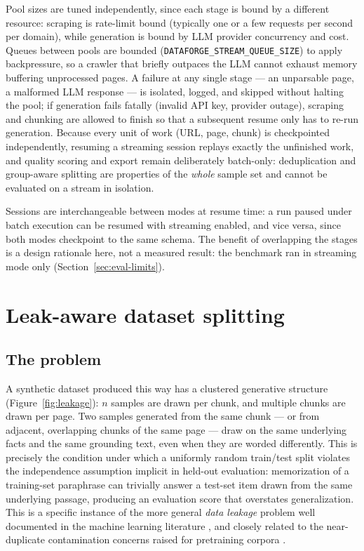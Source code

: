 \documentclass[11pt]{article}
\begin{document}
Pool sizes are tuned independently, since each stage is bound by a
different resource: scraping is rate-limit bound (typically one or a few
requests per second per domain), while generation is bound by LLM
provider concurrency and cost. Queues between pools are bounded
(\texttt{DATAFORGE\_STREAM\_QUEUE\_SIZE}) to apply backpressure, so a
crawler that briefly outpaces the LLM cannot exhaust memory buffering
unprocessed pages. A failure at any single stage --- an unparsable page,
a malformed LLM response --- is isolated, logged, and skipped without
halting the pool; if generation fails fatally (invalid API key,
provider outage), scraping and chunking are allowed to finish so that a
subsequent resume only has to re-run generation. Because every unit of
work (URL, page, chunk) is checkpointed independently, resuming a
streaming session replays exactly the unfinished work, and quality
scoring and export remain deliberately batch-only: deduplication and
group-aware splitting are properties of the \emph{whole} sample set and
cannot be evaluated on a stream in isolation.

Sessions are interchangeable between modes at resume time: a run paused
under batch execution can be resumed with streaming enabled, and vice
versa, since both modes checkpoint to the same schema. The benefit of
overlapping the stages is a design rationale here, not a measured result:
the benchmark ran in streaming mode only (Section~\ref{sec:eval-limits}).

\section{Leak-aware dataset splitting}
\label{sec:leakage}

\subsection{The problem}
A synthetic dataset produced this way has a clustered generative
structure (Figure~\ref{fig:leakage}): $n$ samples are drawn per chunk,
and multiple chunks are drawn per page. Two samples generated from the same chunk --- or from
adjacent, overlapping chunks of the same page --- draw on the same
underlying facts and the same grounding text, even when they are worded
differently. This is precisely the condition under
which a uniformly random train/test split violates the independence
assumption implicit in held-out evaluation: memorization of a
training-set paraphrase can trivially answer a test-set item drawn from
the same underlying passage, producing an evaluation score that
overstates generalization. This is a specific instance of the more
general \emph{data leakage} problem well documented in the machine
learning literature \cite{kaufman2012leakage}, and closely related to
the near-duplicate contamination concerns raised for pretraining corpora
\cite{lee2022deduplicating}.
\end{document}
